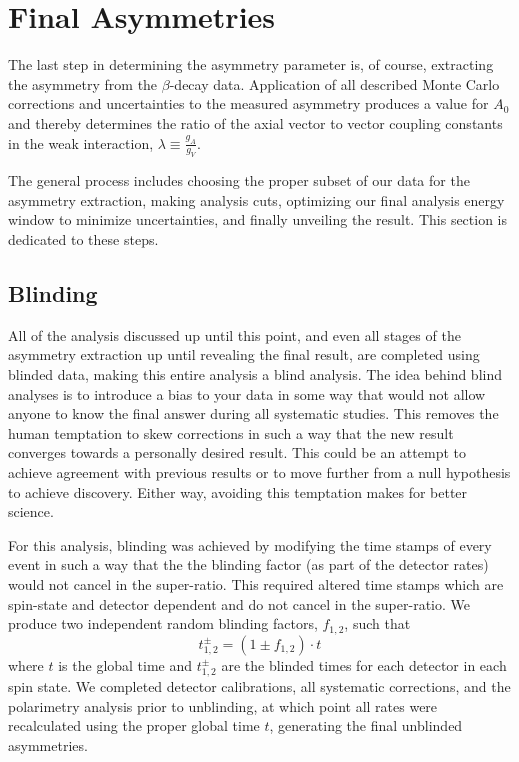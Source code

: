 

\section{Final Asymmetries}

The last step in determining the asymmetry parameter is, of course, extracting the
asymmetry from the $\beta$-decay data. Application of all described Monte Carlo
corrections and uncertainties to the measured asymmetry produces a value for
$A_0$ and thereby determines the ratio of the axial vector to vector coupling
constants in the weak interaction, $\lambda \equiv \frac{g_A}{g_V}$.

The general process includes choosing the proper subset of our data for the
asymmetry extraction, making analysis cuts, optimizing our final analysis energy
window to minimize uncertainties, and finally unveiling the result. This section
is dedicated to these steps.

\subsection{Blinding}
All of the analysis discussed up until this point, and even all stages of the
asymmetry extraction up until revealing the final result,
are completed using blinded data, making this entire
analysis a blind analysis. The idea behind blind analyses
is to introduce a bias to your data in some way
that would not allow anyone to know the final answer during all systematic studies. This
removes the human temptation to skew corrections in such a way that the new result
converges towards a personally desired result. This could be an attempt to achieve agreement
with previous results or to move further from a null hypothesis to achieve discovery.
Either way, avoiding this temptation makes for better science.

For this analysis, blinding was achieved by modifying the time stamps of every event
in such a way that the the blinding factor (as part of the
detector rates) would not cancel in the super-ratio. This required
altered time stamps which are spin-state and detector
dependent and do not cancel in the super-ratio. We produce two independent
random blinding factors, $f_{1,2}$, such that
%
\begin{equation}
  t^{\pm}_{1,2} = (1 \pm f_{1,2}) \cdot t
\end{equation}
%
\noindent where $t$ is the global time
and $t^{\pm}_{1,2}$ are the blinded times for each detector in each spin state. We completed
detector calibrations, all systematic corrections, and the polarimetry analysis prior to
unblinding, at which point all rates were recalculated using the proper global time $t$,
generating the final unblinded asymmetries.

